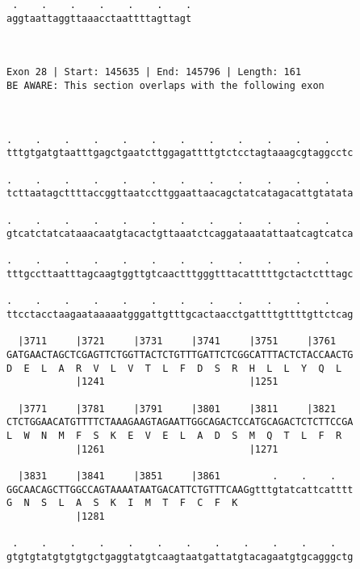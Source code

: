 \documentclass{article}
\begin{document}
\begin{Verbatim}
 .    .    .    .    .    .    .
aggtaattaggttaaacctaattttagttagt
                                
                                
 
Exon 28 | Start: 145635 | End: 145796 | Length: 161
BE AWARE: This section overlaps with the following exon



.    .    .    .    .    .    .    .    .    .    .    .    
tttgtgatgtaatttgagctgaatcttggagattttgtctcctagtaaagcgtaggcctc
                                                            
.    .    .    .    .    .    .    .    .    .    .    .    
tcttaatagcttttaccggttaatccttggaattaacagctatcatagacattgtatata
                                                            
.    .    .    .    .    .    .    .    .    .    .    .    
gtcatctatcataaacaatgtacactgttaaatctcaggataaatattaatcagtcatca
                                                            
.    .    .    .    .    .    .    .    .    .    .    .    
tttgccttaatttagcaagtggttgtcaactttgggtttacatttttgctactctttagc
                                                            
.    .    .    .    .    .    .    .    .    .    .    .    
ttcctacctaagaataaaaatgggattgtttgcactaacctgattttgttttgttctcag
                                                            
  |3711     |3721     |3731     |3741     |3751     |3761   
GATGAACTAGCTCGAGTTCTGGTTACTCTGTTTGATTCTCGGCATTTACTCTACCAACTG
D  E  L  A  R  V  L  V  T  L  F  D  S  R  H  L  L  Y  Q  L  
            |1241                         |1251             
  
  |3771     |3781     |3791     |3801     |3811     |3821   
CTCTGGAACATGTTTTCTAAAGAAGTAGAATTGGCAGACTCCATGCAGACTCTCTTCCGA
L  W  N  M  F  S  K  E  V  E  L  A  D  S  M  Q  T  L  F  R  
            |1261                         |1271             
  
  |3831     |3841     |3851     |3861         .    .    .   
GGCAACAGCTTGGCCAGTAAAATAATGACATTCTGTTTCAAGgtttgtatcattcatttt
G  N  S  L  A  S  K  I  M  T  F  C  F  K                    
            |1281                                           
  
 .    .    .    .    .    .    .    .    .    .    .    .   
gtgtgtatgtgtgtgctgaggtatgtcaagtaatgattatgtacagaatgtgcagggctg
                                                            

\end{Verbatim}
\end{document}
